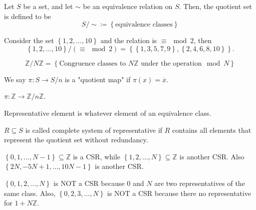 \begin{definition} \label{def: quotient map}
    Let \(S\) be a set, and let \(\sim \) be an equivalence relation on \(S\). Then, the quotient set is defined to be
    \[
        S / \sim \coloneqq  \left\{ \text{equivalence classes} \right\} 
    \]    
\end{definition}

\begin{eg}
    Consider the set \(\left\{ 1,2, \dots , 10 \right\} \) and the relation is \(\equiv \mod{2}\), then
    \[
        \left\{ 1,2,\dots ,10 \right\} / (\equiv \mod{2}) = \left\{ \left\{ 1,3,5,7,9 \right\}, \left\{ 2,4,6,8,10 \right\}   \right\}. 
    \]  
\end{eg}

\begin{eg}
    \[
        \mathbb{Z} / N \mathbb{Z} = \left\{ \text{Congruence classes to } N\mathbb{Z} \text{ under the operation} \mod{N}  \right\}  
    \]
\end{eg}

\begin{definition} \label{def: quotient map}
    We say \(\pi : S \to S / n\) is a "quotient map" if \(\pi (x) = \overline{x} \).  
\end{definition}

\begin{eg}
    \(\pi : \mathbb{Z} \to \mathbb{Z} / n \mathbb{Z} \). 
\end{eg}

\begin{definition}
    Representative element is whatever element of an equivalence class.
\end{definition}

\begin{definition}
    \(R \subseteq S\) is called complete system of representative if \(R\) contains all elements that represent the quotient set without redundancy.   
\end{definition}
\begin{eg}
    \(\left\{ 0, 1, \dots , N - 1 \right\} \subseteq \mathbb{Z} \) is a CSR, while \(\left\{ 1,2,\dots , N \right\} \subseteq \mathbb{Z}  \) is another CSR. Also \(\left\{ 2N, -5N+ 1, \dots , 10N - 1 \right\}  \) is another CSR.    
\end{eg}

\begin{eg}
    \(\left\{ 0,1,2, \dots ,N \right\} \) is NOT a CSR because \(0\) and \(N\) are two representatives of the same class. Also, \(\left\{ 0, 2,3, \dots , N \right\} \) is NOT a CSR because there no representative for \(1 + N \mathbb{Z} \).      
\end{eg}

